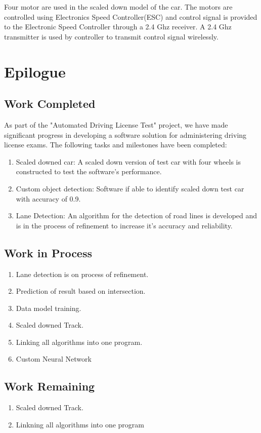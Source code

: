 Four motor are used in the scaled down model of the car. The motors are controlled using Electronics Speed Controller(ESC) and control signal is provided to the Electronic Speed Controller through a 2.4 Ghz receiver. A 2.4 Ghz transmitter is used by controller to transmit control signal wirelessly. 

\chapter{Epilogue}

\section{Work Completed}
As part of the "Automated Driving License Test" project, we have made significant progress in developing a software solution for administering driving license exams. The following tasks and milestones have been completed:
\begin{enumerate}
\item Scaled downed car: A scaled down version of test car with four wheels is constructed to test the software's performance.  
\item Custom object detection: Software if able to identify scaled down test car with accuracy of 0.9.
\item Lane Detection: An algorithm for the detection of road lines is developed and is in the process of refinement to increase it's accuracy and 	reliability. 
\end{enumerate}


\section{Work in Process}
\begin{enumerate}
\item Lane detection is on process of refinement.
\item Prediction of result based on intersection.
\item Data model training.
\item Scaled downed Track.
\item Linking all algorithms into one program.
\item Custom Neural Network
\end{enumerate}

\section{Work Remaining}
\begin{enumerate}
\item Scaled downed Track.
\item Linkning all algorithms into one program
\end{enumerate}
   

